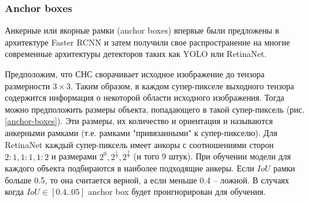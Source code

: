\subsubsection{Anchor boxes}

Анкерные или якорные рамки (anchor boxes) впервые были предложены в архитектуре Faster RCNN и затем получили свое распространение на многие современные архитектуры детекторов таких как YOLO или RetinaNet. 

Предположим, что СНС сворачивает исходное изображение до тензора размерности $3 \times 3$. Таким образом, в каждом супер-пикселе выходного тензора содержится информация о некоторой области исходного изображения. Тогда можно предположить размеры объекта, попадающего в такой супер-пиксель (рис. \ref{anchor-boxes}). Эти размеры, их количество и ориентация и называются анкерными рамками (т.е. рамками "привязанными" к супер-пикселю). Для RetinaNet каждый супер-пиксель имеет анкоры с соотношениями сторон $2:1, 1:1, 1:2$ и размерами $2^0, 2^{\frac{1}{3}}, 2^{\frac{2}{3}}$ (и того 9 штук). При обучении модели для каждого объекта подбираются в наиболее подходящие анкеры. Если $IoU$ рамки больше 0.5, то она считается верной, а если меньше 0.4 -- ложной. В случаях когда $IoU \in [0.4 .. 05]$ anchor box будет проигнорирован для обучения.

